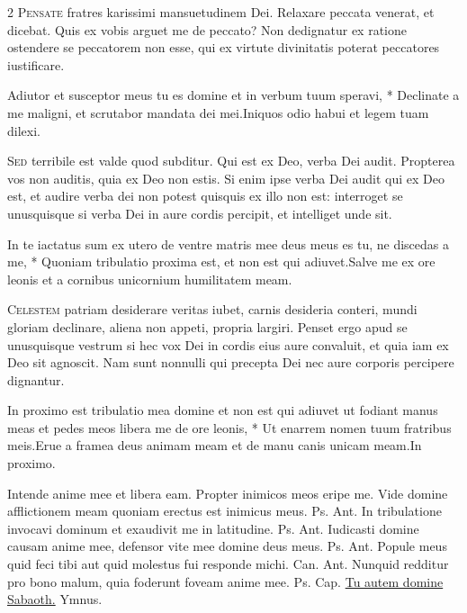 \begin{multicols*}{2}
\lettrine[lines=2]{\zallmancaps \color{Red} P}{ensate} fratres karissimi mansuetudinem Dei. Relaxare peccata venerat, et dicebat. Quis ex vobis arguet me de peccato? Non dedignatur ex ratione ostendere se peccatorem non esse, qui ex virtute divinitatis poterat peccatores iustificare.
\begin{responsory}
{Adiutor et susceptor meus tu es domine et in verbum tuum speravi, * Declinate a me maligni, et scrutabor mandata dei mei.}{Iniquos odio habui et legem tuam dilexi.}
\end{responsory}%
\lettrine[lines=2]{\zallmancaps \color{Blue} S}{ed} terribile est valde quod subditur. Qui est ex Deo, verba Dei audit. Propterea vos non auditis, quia ex Deo non estis. Si enim ipse verba Dei audit qui ex Deo est, et audire verba dei non potest quisquis ex illo non est: interroget se unusquisque si verba Dei in aure cordis percipit, et intelliget unde sit.
\begin{responsory}[in-te-iactatus]
{In te iactatus sum ex utero de ventre matris mee deus meus es tu, ne discedas a me, * Quoniam tribulatio proxima est, et non est qui adiuvet.}{Salve me ex ore leonis et a cornibus unicornium humilitatem meam.}
\end{responsory}%
\lettrine[lines=2]{\zallmancaps \color{Red} C}{elestem} patriam desiderare veritas iubet, carnis desideria conteri, mundi gloriam declinare, aliena non appeti, propria largiri. Penset ergo apud se unusquisque vestrum si hec vox Dei in cordis eius aure convaluit, et quia iam ex Deo sit agnoscit. Nam sunt nonnulli qui precepta Dei nec aure corporis percipere dignantur.
\begin{responsory}[in-proximo]
{In proximo est tribulatio mea domine et non est qui adiuvet ut fodiant manus meas et pedes meos libera me de ore leonis, * Ut enarrem nomen tuum fratribus meis.}{Erue a framea deus animam meam et de manu canis unicam meam.}In proximo.
\end{responsory}%
\newline \V Intende anime mee et libera eam. \R Propter inimicos meos eripe me.
 Vide domine afflictionem meam quoniam erectus est inimicus meus. {\color{Red} Ps.}  {\color{Red} Ant.} In tribulatione invocavi dominum et exaudivit me in latitudine. {\color{Red} Ps.}  {\color{Red} Ant.} Iudicasti domine causam anime mee, defensor vite mee domine deus meus. {\color{Red} Ps.}  {\color{Red} Ant.} Popule meus quid feci tibi aut quid molestus fui responde michi. {\color{Red} Can.}  {\color{Red} Ant.} Nunquid redditur pro bono malum, quia foderunt foveam anime mee. {\color{Red} Ps.}  {\color{Red} Cap.} \hyperlink{tu-autem-capitulum}{Tu autem domine Sabaoth.} {\color{Red} Ymnus.}

\end{multicols*}
